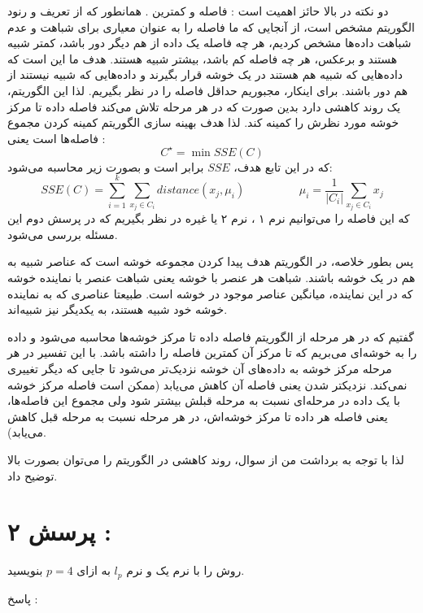\documentclass[a4paper, 12pt]{article}
\begin{document}
	
	دو نکته در بالا حائز اهمیت است : 
	فاصله و کمترین . 
	همانطور که  از تعریف و رنود الگوریتم 
	مشخص است، از آنجایی که ما فاصله را به عنوان معیاری برای شباهت و عدم شباهت داده‌ها مشخص کردیم، هر چه فاصله یک داده از هم دیگر دور باشد، کمتر شبیه هستند و برعکس، هر چه فاصله کم باشد، بیشتر شبیه هستند. هدف ما این است که داده‌هایی که شبیه هم هستند در یک خوشه قرار بگیرند و داده‌هایی که شبیه نیستند از هم دور باشند.  برای اینکار، مجبوریم حداقل فاصله را در نظر بگیریم. لذا این الگوریتم، یک روند کاهشی دارد بدین صورت که در هر مرحله تلاش می‌کند فاصله داده تا مرکز خوشه مورد نظرش را کمینه کند.  لذا هدف بهینه سازی الگوریتم
	کمینه کردن مجموع فاصله‌ها است یعنی :
	\[
	C^\star = \min SSE(C)
	\]
	که در این تابع هدف، 
	$SSE$
	برابر 
	است و بصورت زیر محاسبه می‌شود:
	\[
	SSE(C) = \sum\limits_{i=1}^{k}\sum\limits_{x_j \in C_i} distance(x_j, \mu_i) \hspace{2cm}\mu_i = \frac{1}{|C_i|}\sum\limits_{x_j \in C_i}x_j
	\]
	که این فاصله را می‌توانیم 
	نرم ۱ ، نرم ۲ یا غیره در نظر بگیریم که در پرسش دوم این مسئله بررسی می‌شود.
	
	پس بطور خلاصه، در الگوریتم 
	هدف پیدا کردن مجموعه خوشه است که عناصر شبیه به هم در یک خوشه باشند. شباهت هر عنصر با خوشه یعنی شباهت عنصر با نماینده خوشه که در 
	این نماینده، میانگین عناصر موجود در خوشه است. طبیعتا عناصری که به نماینده خوشه خود شبیه هستند، به یکدیگر نیز شبیه‌اند. 
	
	گفتیم که در هر مرحله از الگوریتم فاصله داده تا مرکز خوشه‌ها محاسبه می‌شود و داده را به خوشه‌ای می‌بریم که تا مرکز آن کمترین فاصله را داشته باشد. با این تفسیر در هر مرحله مرکز خوشه به داده‌های آن خوشه نزدیک‌تر می‌شود تا جایی که دیگر تغییری نمی‌کند. نزدیکتر شدن یعنی فاصله آن کاهش می‌یابد (ممکن است فاصله مرکز خوشه با یک داده در مرحله‌ای نسبت به مرحله قبلش بیشتر شود ولی مجموع این فاصله‌ها، یعنی فاصله هر داده تا مرکز خوشه‌اش، در هر مرحله نسبت به مرحله قبل کاهش می‌یابد). 

لذا با توجه به برداشت من از سوال، روند کاهشی در الگوریتم 
را می‌توان بصورت بالا توضیح داد.
	
	
	
	
	\section*{پرسش ۲ : }
	روش 
	را با نرم یک و نرم 
	$l_p$
	به ازای 
	$p=4$
	بنویسید.
	
	\vspace{5mm}
	پاسخ :
	
\end{document}
